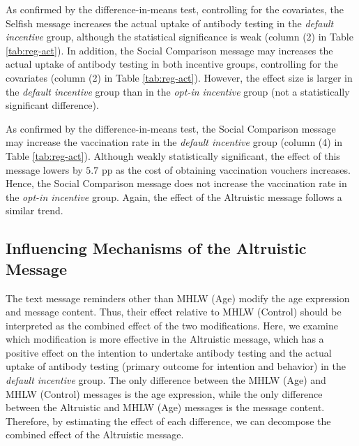\documentclass[
      12pt,
    a4paper
]{article}
\begin{document}
As confirmed by the difference-in-means test, controlling for the covariates, the Selfish message increases the actual uptake of antibody testing in the \emph{default incentive} group, although the statistical significance is weak (column (2) in Table \ref{tab:reg-act}). In addition, the Social Comparison message may increases the actual uptake of antibody testing in both incentive groups, controlling for the covariates (column (2) in Table \ref{tab:reg-act}). However, the effect size is larger in the \emph{default incentive} group than in the \emph{opt-in incentive} group (not a statistically significant difference).

As confirmed by the difference-in-means test, the Social Comparison message may increase the vaccination rate in the \emph{default incentive} group (column (4) in Table \ref{tab:reg-act}). Although weakly statistically significant, the effect of this message lowers by \(5.7\) pp as the cost of obtaining vaccination vouchers increases. Hence, the Social Comparison message does not increase the vaccination rate in the \emph{opt-in incentive} group. Again, the effect of the Altruistic message follows a similar trend.

\hypertarget{influencing-mechanisms-of-the-altruistic-message}{%
\subsection{Influencing Mechanisms of the Altruistic Message}\label{influencing-mechanisms-of-the-altruistic-message}}

The text message reminders other than MHLW (Age) modify the age expression and message content. Thus, their effect relative to MHLW (Control) should be interpreted as the combined effect of the two modifications. Here, we examine which modification is more effective in the Altruistic message, which has a positive effect on the intention to undertake antibody testing and the actual uptake of antibody testing (primary outcome for intention and behavior) in the \emph{default incentive} group. The only difference between the MHLW (Age) and MHLW (Control) messages is the age expression, while the only difference between the Altruistic and MHLW (Age) messages is the message content. Therefore, by estimating the effect of each difference, we can decompose the combined effect of the Altruistic message.
\end{document}
